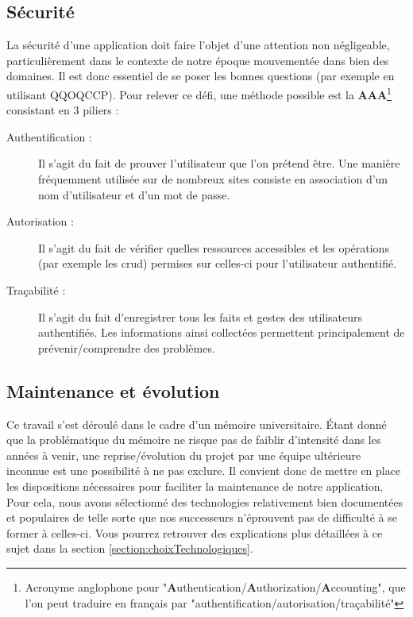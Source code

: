 \subsection*{Sécurité}

La sécurité d'une application doit faire l'objet d'une attention non négligeable, particulièrement dans le contexte de notre époque mouvementée dans bien des domaines. Il est donc essentiel de se poser les bonnes questions (par exemple en utilisant \Gls{QQOQCCP}). Pour relever ce défi, une méthode possible est la \textbf{AAA}\footnote{Acronyme anglophone pour "\textbf{A}uthentication/\textbf{A}uthorization/\textbf{A}ccounting", que l'on peut traduire en français par "authentification/autorisation/traçabilité" }
consistant en 3 piliers : 

\begin{description}
    \item[Authentification :] Il s'agit du fait de prouver l'utilisateur que l'on prétend être. Une manière fréquemment utilisée sur de nombreux sites consiste en association d'un nom d'utilisateur et d'un mot de passe.
    \item[Autorisation :] Il s'agit du fait de vérifier quelles ressources accessibles et les opérations (par exemple les \Gls{crud}) permises sur celles-ci pour l'utilisateur authentifié.
    \item[Traçabilité :] Il s'agit du fait d'enregistrer tous les faits et gestes des utilisateurs authentifiés. Les informations ainsi collectées permettent principalement de prévenir/comprendre des problèmes. 
\end{description}

\subsection*{Maintenance et évolution}

Ce travail s'est déroulé dans le cadre d'un mémoire universitaire. Étant donné que la problématique du mémoire ne risque pas de faiblir d'intensité dans les années à venir, une reprise/évolution du projet par une équipe ultérieure inconnue est une possibilité à ne pas exclure. Il convient donc de mettre en place les dispositions nécessaires pour faciliter la maintenance de notre application. \\

Pour cela, nous avons sélectionné des technologies relativement bien documentées et populaires de telle sorte que nos successeurs n'éprouvent pas de difficulté à se former à celles-ci. Vous pourrez retrouver des explications plus détaillées à ce sujet dans la section \ref{section:choixTechnologiques}.

